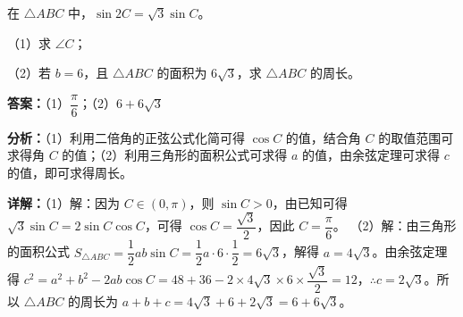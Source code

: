 \begin{question}[points=13]
在 $\triangle ABC$ 中，$\sin 2C = \sqrt{3} \sin C$。

（1）求 $\angle C$；

（2）若 $b=6$，且 $\triangle ABC$ 的面积为 $6\sqrt{3}$，求 $\triangle ABC$ 的周长。
\begin{solution}
\textbf{答案：}（1）$\dfrac{\pi}{6}$；（2）$6+6\sqrt{3}$

\textbf{分析：}（1）利用二倍角的正弦公式化简可得 $\cos C$ 的值，结合角 $C$ 的取值范围可求得角 $C$ 的值；（2）利用三角形的面积公式可求得 $a$ 的值，由余弦定理可求得 $c$ 的值，即可求得周长。

\textbf{详解：}（1）解：因为 $C\in(0,\pi)$，则 $\sin C>0$，由已知可得 $\sqrt{3}\sin C = 2\sin C\cos C$，可得 $\cos C = \dfrac{\sqrt{3}}{2}$，因此 $C=\dfrac{\pi}{6}$。
（2）解：由三角形的面积公式 $S_{\triangle ABC} = \dfrac{1}{2}ab\sin C = \dfrac{1}{2}a\cdot 6\cdot \dfrac{1}{2} = 6\sqrt{3}$，解得 $a=4\sqrt{3}$。由余弦定理得 $c^2 = a^2+b^2-2ab\cos C = 48+36-2\times 4\sqrt{3}\times 6\times \dfrac{\sqrt{3}}{2} = 12$，$\therefore c=2\sqrt{3}$。所以 $\triangle ABC$ 的周长为 $a+b+c = 4\sqrt{3}+6+2\sqrt{3} = 6+6\sqrt{3}$。
\end{solution}
\end{question}

